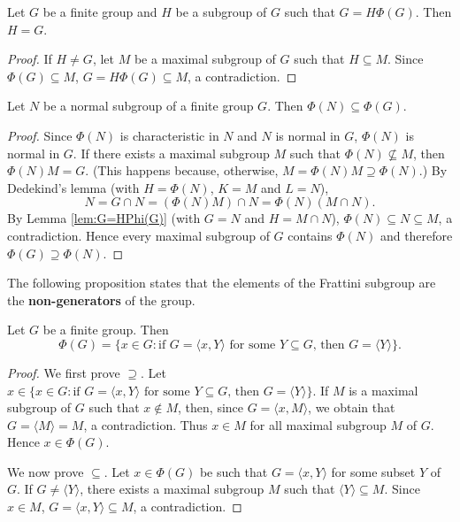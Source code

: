 \begin{lemma}
\label{lem:G=HPhi(G)}
Let $G$ be a finite group and $H$ be a subgroup of $G$ such that 
$G=H\Phi(G)$. Then $H=G$.
\end{lemma}

\begin{proof}
If $H\ne G$, let $M$ be a maximal subgroup of $G$ such that 
$H\subseteq M$. Since $\Phi(G)\subseteq M$, $G=H\Phi(G)\subseteq M$, a 
contradiction. 
\end{proof}

\begin{proposition}
\label{pro:phi(N)phi(G)}
Let $N$ be a normal subgroup of a finite group $G$. Then 
$\Phi(N)\subseteq\Phi(G)$.
\end{proposition}

\begin{proof}
Since $\Phi(N)$ is characteristic in $N$ and $N$ 
is normal in $G$, $\Phi(N)$ is normal in $G$. 
If there exists a maximal subgroup $M$ such that 
$\Phi(N)\not\subseteq M$, then $\Phi(N)M=G$. (This happens
because, otherwise, $M=\Phi(N)M\supseteq\Phi(N)$.) By Dedekind's lemma (with  $H=\Phi(N)$, $K=M$ and $L=N$), 
\[
N=G\cap N=(\Phi(N)M)\cap N=\Phi(N)(M\cap N).
\]
By Lemma \ref{lem:G=HPhi(G)} (with $G=N$ and $H=M\cap N$), 
$\Phi(N)\subseteq N\subseteq M$, a contradiction. 
Hence every maximal subgroup of $G$ contains $\Phi(N)$ and therefore 
$\Phi(G)\supseteq\Phi(N)$. 
\end{proof}

The following proposition states that the 
elements of the Frattini subgroup are the \textbf{non-generators} of 
the group. 

\begin{proposition}
	\label{pro:nongenerators}
	Let $G$ be a finite group. Then 
 	\[
	\Phi(G)=\{x\in G:\text{if $G=\langle x,Y\rangle$ for some $Y\subseteq G$, then $G=\langle Y\rangle$}\}.
	\]
\end{proposition}

\begin{proof}
We first prove $\supseteq$. Let $x\in \{x\in G:\text{if $G=\langle x,Y\rangle$ for some $Y\subseteq G$, then $G=\langle Y\rangle$}\}$. If $M$ is a maximal subgroup of $G$ such that $x\not\in M$, then, since $G=\langle
	x,M\rangle$, we obtain that $G=\langle M\rangle=M$, a contradiction. Thus $x\in M$ for all maximal subgroup $M$ of $G$. Hence 
 $x\in \Phi(G)$. 

We now prove $\subseteq$. Let $x\in\Phi(G)$ be such that $G=\langle
	x,Y\rangle$ for some subset $Y$ of $G$. If $G\ne \langle Y\rangle$,
	there exists a maximal subgroup $M$ such that $\langle Y\rangle\subseteq M$. Since
	$x\in M$, $G=\langle x,Y\rangle\subseteq M$, a contradiction. 
\end{proof}

